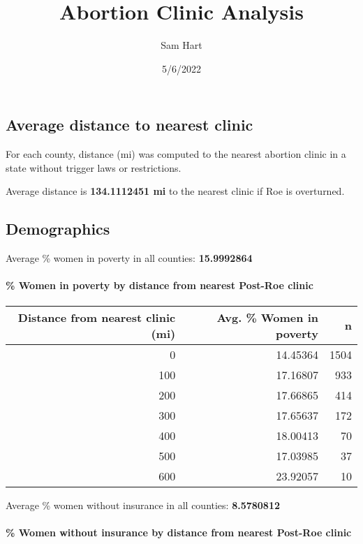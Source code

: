 \documentclass[
]{article}
\title{Abortion Clinic Analysis}
\author{Sam Hart}
\date{5/6/2022}
\begin{document}
\maketitle

\hypertarget{average-distance-to-nearest-clinic}{%
\subsection{Average distance to nearest
clinic}\label{average-distance-to-nearest-clinic}}

For each county, distance (mi) was computed to the nearest abortion
clinic in a state without trigger laws or restrictions.

Average distance is \textbf{134.1112451 mi} to the nearest clinic if Roe
is overturned.

\hypertarget{demographics}{%
\subsection{Demographics}\label{demographics}}

Average \% women in poverty in all counties: \textbf{15.9992864}

\hypertarget{women-in-poverty-by-distance-from-nearest-post-roe-clinic}{%
\paragraph{\% Women in poverty by distance from nearest Post-Roe
clinic}\label{women-in-poverty-by-distance-from-nearest-post-roe-clinic}}

\begin{longtable}[]{@{}rrr@{}}
\toprule
Distance from nearest clinic (mi) & Avg. \% Women in poverty & n \\
\midrule
\endhead
0 & 14.45364 & 1504 \\
100 & 17.16807 & 933 \\
200 & 17.66865 & 414 \\
300 & 17.65637 & 172 \\
400 & 18.00413 & 70 \\
500 & 17.03985 & 37 \\
600 & 23.92057 & 10 \\
\bottomrule
\end{longtable}

Average \% women without insurance in all counties: \textbf{8.5780812}

\hypertarget{women-without-insurance-by-distance-from-nearest-post-roe-clinic}{%
\paragraph{\% Women without insurance by distance from nearest Post-Roe
clinic}\label{women-without-insurance-by-distance-from-nearest-post-roe-clinic}}
\end{document}
